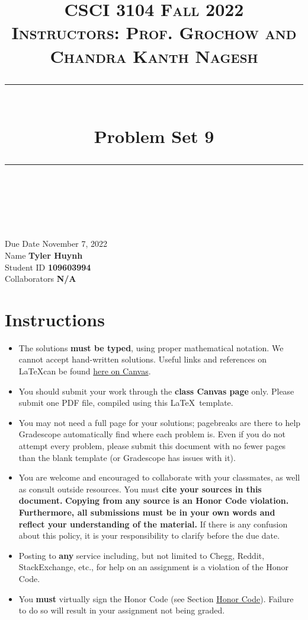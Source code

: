 \documentclass[11pt]{article}
\title{
\normalfont \normalsize 
\textsc{CSCI 3104 Fall 2022 \\ 
Instructors: Prof. Grochow and Chandra Kanth Nagesh} \\
[10pt] 
\rule{\linewidth}{0.5pt} \\[6pt] 
\huge Problem Set 9 \\
\rule{\linewidth}{2pt}  \\[10pt]
}
\date{}
\theoremstyle{definition}
\theoremstyle{definition}
\theoremstyle{definition}
\begin{document}

\maketitle


\noindent
Due Date \dotfill November 7, 2022 \\
Name \dotfill \textbf{Tyler Huynh} \\
Student ID \dotfill \textbf{109603994} \\
Collaborators \dotfill \textbf{N/A}

\tableofcontents

\section*{Instructions}
 \begin{itemize}
	\item The solutions \textbf{must be typed}, using proper mathematical notation. We cannot accept hand-written solutions. Useful links and references on \LaTeX can be found \href{https://canvas.colorado.edu/courses/75824/pages/latex}{here on Canvas}.
	\item You should submit your work through the \textbf{class Canvas page} only. Please submit one PDF file, compiled using this \LaTeX \ template.
	\item You may not need a full page for your solutions; pagebreaks are there to help Gradescope automatically find where each problem is. Even if you do not attempt every problem, please submit this document with no fewer pages than the blank template (or Gradescope has issues with it).

	\item You are welcome and encouraged to collaborate with your classmates, as well as consult outside resources. You must \textbf{cite your sources in this document.} \textbf{Copying from any source is an Honor Code violation. Furthermore, all submissions must be in your own words and reflect your understanding of the material.} If there is any confusion about this policy, it is your responsibility to clarify before the due date. 

	\item Posting to \textbf{any} service including, but not limited to Chegg, Reddit, StackExchange, etc., for help on an assignment is a violation of the Honor Code.

	\item You \textbf{must} virtually sign the Honor Code (see Section \hyperlink{HonorCode}{Honor Code}). Failure to do so will result in your assignment not being graded.
\end{itemize}
\end{document}

